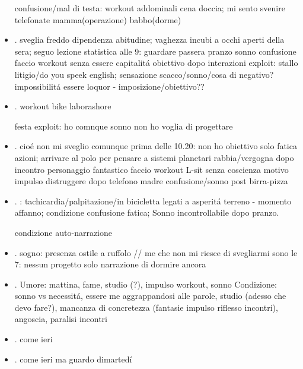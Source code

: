 \begin{itemize}
confusione/mal di testa: workout addominali cena doccia; mi sento svenire
telefonate mamma(operazione) babbo(dorme)

\item {}.
sveglia freddo dipendenza abitudine; vaghezza incubi a occhi aperti della sera; seguo lezione statistica alle 9: guardare passera
pranzo sonno confusione
faccio workout senza essere capitalit\'a obiettivo
dopo interazioni exploit: stallo litigio/do you speek english; sensazione scacco/sonno/cosa di negativo? impossibilit\'a essere loquor - imposizione/obiettivo??

\item {}.
workout bike
laborashore

festa exploit: ho comnque sonno non ho voglia di progettare

\item {}.
cio\'e non mi sveglio comunque prima delle 10.20: non ho obiettivo solo fatica azioni; arrivare al polo per pensare a sistemi planetari
rabbia/vergogna dopo incontro personaggio fantastico
faccio workout L-sit senza coscienza motivo
impulso distruggere dopo telefono madre
confusione/sonno post birra-pizza

\item {}.
: tachicardia/palpitazione/in bicicletta legati a asperit\'a terreno - momento affanno; condizione confusione fatica; Sonno incontrollabile dopo pranzo.

condizione auto-narrazione
\item {}.
sogno: presenza ostile a ruffolo // me che non mi riesce di svegliarmi
sono le 7: nessun progetto solo narrazione di dormire ancora


\item {}.
Umore: mattina, fame, studio (?), impulso workout, sonno
Condizione: sonno vs necessit\'a, essere me aggrappandosi alle parole, studio (adesso che devo fare?), mancanza di concretezza (fantasie impulso riflesso incontri),
angoscia, paralisi incontri

\item {}.
come ieri

\item {}.
come ieri ma guardo dimarted\'i


\end{itemize}
